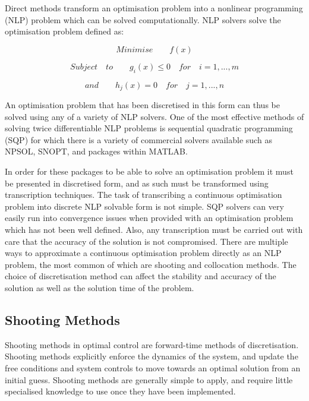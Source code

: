 Direct methods transform an optimisation problem into a nonlinear programming (NLP) problem which can be solved computationally\cite{Stryk1992}. NLP solvers solve the optimisation problem defined as\cite{Bazaraa2013}:

\begin{equation}
Minimise \qquad f(x)
\end{equation}

\begin{equation}
Subject \quad to \qquad g_i(x)\leq0 \quad for \quad i=1,...,m
\end{equation}

\begin{equation}
and \qquad h_j(x) = 0 \quad for \quad j=1,...,n
\end{equation}

An optimisation problem that has been discretised in this form can thus be solved using any of a variety of NLP solvers. One of the most effective methods of solving twice differentiable NLP problems is sequential quadratic programming (SQP)\cite{Boggs2000} for which there is a variety of commercial solvers available such as NPSOL, SNOPT, and packages within MATLAB. 

In order for these packages to be able to solve an optimisation problem it must be presented in discretised form, and as such must be transformed using transcription techniques\cite{Kelly2015}. The task of transcribing a continuous optimisation problem into discrete NLP solvable form is not simple. SQP solvers can very easily run into convergence issues when provided with an optimisation problem which has not been well defined. Also, any transcription must be carried out with care that the accuracy of the solution is not compromised. 
There are multiple ways to approximate a continuous optimisation problem directly as an NLP problem, the most common of which are shooting and collocation methods. The choice of discretisation method can affect the stability and accuracy of the solution as well as the solution time of the problem. 

\subsection{Shooting Methods}

Shooting methods in optimal control are forward-time methods of discretisation\cite{Kelly2015}. Shooting methods explicitly enforce the dynamics of the system, and update the free conditions and system controls to move towards an optimal solution from an initial guess\cite{Kelly2015}. Shooting methods are generally simple to apply, and require little specialised knowledge to use once they have been implemented. 


